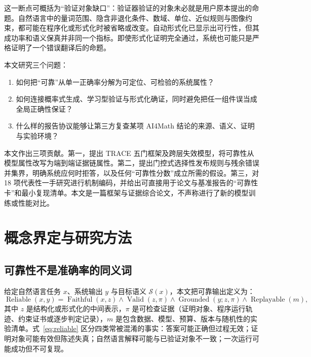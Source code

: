 \documentclass[UTF8,11pt,a4paper,fontset=fandol]{ctexart}
\newcommand{\trace}{\textsf{TRACE}}
\begin{document}
这一断点可概括为“验证对象缺口”：验证器验证的对象未必就是用户原本提出的命题。自然语言中的量词范围、隐含非退化条件、数域、单位、近似规则与图像约束，都可能在程序化或形式化时被省略或改变。自动形式化已显示出可行性\cite{wu2022autoformalization,azerbayev2023proofnet}，但其成功率和语义保真并非同一个指标。即使形式化证明完全通过，系统也可能只是严格证明了一个错误翻译后的命题。

本文研究三个问题：
\begin{enumerate}[label=\textbf{RQ\arabic*:}]
  \item 如何把“可靠”从单一正确率分解为可定位、可检验的系统属性？
  \item 如何连接概率式生成、学习型验证与形式化确证，同时避免把任一组件误当成全局正确性保证？
  \item 什么样的报告协议能够让第三方复查某项 AI4Math 结论的来源、语义、证明与实验环境？
\end{enumerate}

本文作出三项贡献。第一，提出 \trace{} 五门框架及跨层失效模型，将可靠性从模型属性改写为端到端证据链属性。第二，提出门控式选择性发布规则与残余错误并集界，明确系统应何时拒答，以及任何“可靠性分数”成立所需的假设。第三，对 18 项代表性一手研究进行机制编码，并给出可直接用于论文与基准报告的“可靠性卡”和最小复现清单。本文是一篇框架与证据综合论文，不声称进行了新的模型训练或性能对比。

\section{概念界定与研究方法}
\subsection{可靠性不是准确率的同义词}
给定自然语言任务 $x$、系统输出 $y$ 与目标语义 $\mathcal{S}(x)$，本文把可靠输出定义为：
\begin{equation}
\operatorname{Reliable}(x,y)=
\operatorname{Faithful}(x,z)\land
\operatorname{Valid}(z,\pi)\land
\operatorname{Grounded}(y;z,\pi)\land
\operatorname{Replayable}(m),
\label{eq:reliable}
\end{equation}
其中 $z$ 是结构化或形式化的中间表示，$\pi$ 是可检查证据（证明对象、程序运行轨迹、约束证书或逐步判定记录），$m$ 是包含数据、模型、预算、版本与随机性的实验清单。式~\eqref{eq:reliable} 区分四类常被混淆的事实：答案可能正确但过程无效；证明对象可能有效但陈述失真；自然语言解释可能与已验证对象不一致；一次运行可能成功但不可复现。
\end{document}
